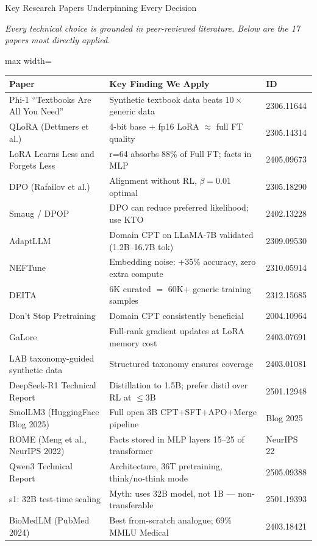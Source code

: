\documentclass[aspectratio=169,11pt]{beamer}
\begin{document}
\begin{frame}[shrink=10]{Key Research Papers Underpinning Every Decision}
\begin{center}
  {\small\color{slate}\itshape
   Every technical choice is grounded in peer-reviewed literature.
   Below are the 17 papers most directly applied.}
  \vspace{4pt}
  \begin{adjustbox}{max width=\textwidth}
  \begin{tabular}{@{}p{4.8cm}p{7.0cm}l@{}}
    \toprule
    \textbf{Paper} & \textbf{Key Finding We Apply} & \textbf{ID}\\
    \midrule
    Phi-1 ``Textbooks Are All You Need'' & Synthetic textbook data beats $10\times$ generic data & 2306.11644\\
    QLoRA (Dettmers et al.) & 4-bit base + fp16 LoRA $\approx$ full FT quality & 2305.14314\\
    LoRA Learns Less and Forgets Less & r=64 absorbs 88\% of Full FT; facts in MLP & 2405.09673\\
    DPO (Rafailov et al.) & Alignment without RL, $\beta=0.01$ optimal & 2305.18290\\
    Smaug / DPOP & DPO can reduce preferred likelihood; use KTO & 2402.13228\\
    AdaptLLM & Domain CPT on LLaMA-7B validated (1.2B--16.7B tok) & 2309.09530\\
    NEFTune & Embedding noise: +35\% accuracy, zero extra compute & 2310.05914\\
    DEITA & 6K curated $=$ 60K+ generic training samples & 2312.15685\\
    Don't Stop Pretraining & Domain CPT consistently beneficial & 2004.10964\\
    GaLore & Full-rank gradient updates at LoRA memory cost & 2403.07691\\
    LAB taxonomy-guided synthetic data & Structured taxonomy ensures coverage & 2403.01081\\
    DeepSeek-R1 Technical Report & Distillation to 1.5B; prefer distil over RL at $\leq$3B & 2501.12948\\
    SmolLM3 (HuggingFace Blog 2025) & Full open 3B CPT+SFT+APO+Merge pipeline & Blog 2025\\
    ROME (Meng et al., NeurIPS 2022) & Facts stored in MLP layers 15--25 of transformer & NeurIPS 22\\
    Qwen3 Technical Report & Architecture, 36T pretraining, think/no-think mode & 2505.09388\\
    s1: 32B test-time scaling & Myth: uses 32B model, not 1B --- non-transferable & 2501.19393\\
    BioMedLM (PubMed 2024) & Best from-scratch analogue; 69\% MMLU Medical & 2403.18421\\
    \bottomrule
  \end{tabular}
  \end{adjustbox}
\end{center}
\end{frame}
\end{document}
